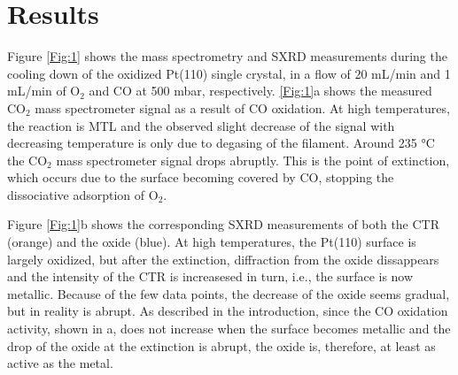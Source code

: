 \documentclass[aps,prl,groupedaddress,twocolumn]{revtex4-1}
\begin{document}





\section{Results}
Figure \ref{Fig:1} shows the mass spectrometry and SXRD measurements during the cooling down of the oxidized Pt(110) single crystal, in a flow of 20 mL/min and 1 mL/min of O$_2$ and CO at 500 mbar, respectively. \ref{Fig:1}a shows the measured CO$_2$ mass spectrometer signal as a result of CO oxidation. At high temperatures, the reaction is MTL and the observed slight decrease of the signal with decreasing temperature is only due to degasing of the filament. Around 235 $\si{\degreeCelsius}$ the CO$_2$ mass spectrometer signal drops abruptly. This is the point of extinction, which occurs due to the surface becoming covered by CO, stopping the dissociative adsorption of O$_2$. 

Figure \ref{Fig:1}b shows the corresponding SXRD measurements of both the CTR (orange) and the oxide (blue). At high temperatures, the Pt(110) surface is largely oxidized, but after the extinction, diffraction from the oxide dissappears and the intensity of the CTR is increasesed in turn, i.e., the surface is now metallic. Because of the few data points, the decrease of the oxide seems gradual, but in reality is abrupt. As described in the introduction, since the CO oxidation activity, shown in a, does not increase when the surface becomes metallic and the drop of the oxide at the extinction is abrupt, the oxide is, therefore, at least as active as the metal.
\end{document}
